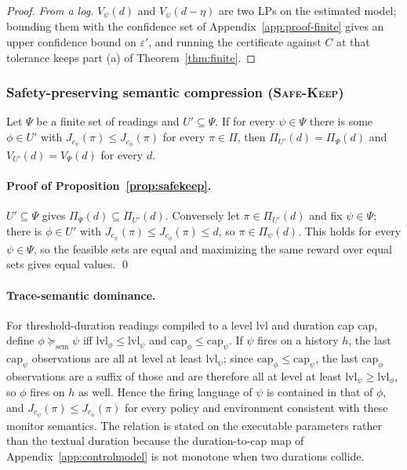 \begin{proof}
\emph{From a log.} $V_\psi(d)$ and $V_\psi(d-\eta)$ are two LPs on the
estimated model; bounding them with the confidence set of
Appendix~\ref{app:proof-finite} gives an upper confidence bound on
$\varepsilon'$, and running the certificate against $C$ at that tolerance
keeps part (a) of Theorem~\ref{thm:finite}.
\end{proof}

\subsubsection*{Safety-preserving semantic compression (\textsc{Safe-Keep})}
\label{app:safekeep}

\begin{proposition}
\label{prop:safekeep}\label{prop:redundancy}
Let \(\Psi\) be a finite set of readings and \(U'\subseteq\Psi\).
If for every \(\psi\in\Psi\) there is some \(\phi\in U'\) with
\(J_{c_\psi}(\pi)\le J_{c_\phi}(\pi)\) for every \(\pi\in\Pi\), then
\(\Pi_{U'}(d)=\Pi_\Psi(d)\) and \(V_{U'}(d)=V_\Psi(d)\) for every \(d\).
\end{proposition}

\paragraph{Proof of Proposition~\ref{prop:safekeep}.}
\(U'\subseteq\Psi\) gives \(\Pi_\Psi(d)\subseteq\Pi_{U'}(d)\). Conversely let
\(\pi\in\Pi_{U'}(d)\) and fix \(\psi\in\Psi\); there is \(\phi\in U'\) with
\(J_{c_\psi}(\pi)\leq J_{c_\phi}(\pi)\leq d\), so \(\pi\in\Pi_\psi(d)\). This holds
for every \(\psi\in\Psi\), so the feasible sets are equal and maximizing the same
reward over equal sets gives equal values. \qed

\paragraph{Trace-semantic dominance.}
For threshold-duration readings compiled to a level \(\mathrm{lvl}\) and duration cap
\(\mathrm{cap}\), define
\(\phi\succeq_{\mathrm{sem}}\psi\) iff \(\mathrm{lvl}_\phi\le\mathrm{lvl}_\psi\) and
\(\mathrm{cap}_\phi\le\mathrm{cap}_\psi\). If \(\psi\) fires on a history \(h\), the
last \(\mathrm{cap}_\psi\) observations are all at level at least
\(\mathrm{lvl}_\psi\); since \(\mathrm{cap}_\phi\le\mathrm{cap}_\psi\), the last
\(\mathrm{cap}_\phi\) observations are a suffix of those and are therefore all at
level at least \(\mathrm{lvl}_\psi\ge\mathrm{lvl}_\phi\), so \(\phi\) fires on \(h\)
as well. Hence the firing language of \(\psi\) is contained in that of \(\phi\), and
\(J_{c_\psi}(\pi)\le J_{c_\phi}(\pi)\) for every policy and environment consistent
with these monitor semantics. The relation is stated on the executable parameters
rather than the textual duration because the duration-to-cap map of
Appendix~\ref{app:controlmodel} is not monotone when two durations collide.

